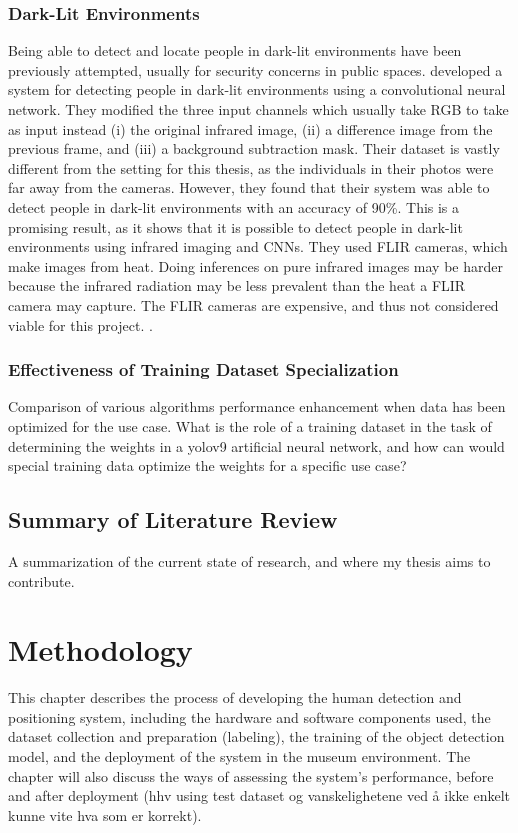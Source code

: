 \subsubsection{Dark-Lit Environments}
Being able to detect and locate people in dark-lit environments have been previously attempted, usually for security concerns in public spaces. \citeauthor{pa2020PersonDetectionNightTimeFLIR} developed a system for detecting people in dark-lit environments using a convolutional neural network. They modified the three input channels which usually take RGB to take as input instead (i) the original infrared image, (ii) a difference image from the previous frame, and (iii) a background subtraction mask. Their dataset is vastly different from the setting for this thesis, as the individuals in their photos were far away from the cameras. However, they found that their system was able to detect people in dark-lit environments with an accuracy of 90\%. This is a promising result, as it shows that it is possible to detect people in dark-lit environments using infrared imaging and CNNs. They used FLIR cameras, which make images from heat. Doing inferences on pure infrared images may be harder because the infrared radiation may be less prevalent than the heat a FLIR camera may capture. The FLIR cameras are expensive, and thus not considered viable for this project. 
\cite{pa2020PersonDetectionNightTimeFLIR}. 




\subsubsection{Effectiveness of Training Dataset Specialization}
\label{sec:dataset_specialization}
Comparison of various algorithms performance enhancement when data has been optimized for the use case. What is the role of a training dataset in the task of determining the weights in a yolov9 artificial neural network, and how can would special training data optimize the weights for a specific use case?



\subsection{Summary of Literature Review}
A summarization of the current state of research, and where my thesis aims to contribute.

\section{Methodology}
This chapter describes the process of developing the human detection and positioning system, including the hardware and software components used, the dataset collection and preparation (labeling), the training of the object detection model, and the deployment of the system in the museum environment. The chapter will also discuss the ways of assessing the system's performance, before and after deployment (hhv using test dataset og vanskelighetene ved å ikke enkelt kunne vite hva som er korrekt).

